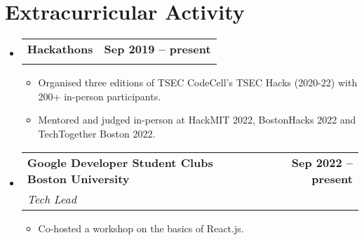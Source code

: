 \documentclass[letterpaper,11pt]{article}
\makeatletter
\newcommand{\resumeItem}[1]{
  \item\small{
    {#1 \vspace{-2pt}}
  }
}
\newcommand{\resumeSubheading}[4]{
  \vspace{-2pt}\item
    \begin{tabular*}{1.0\textwidth}[t]{l@{\extracolsep{\fill}}r}
      \vspace{-2pt}\textbf{#1} & \textbf{\small #2} \\
      \textit{\small#3} & \textit{\small #4} \\
    \end{tabular*}\vspace{-7pt}
}
\newcommand{\resumeSubHeadingListStart}{\begin{itemize}[leftmargin=0.0in, label={}]}
\newcommand{\resumeSubHeadingListEnd}{\end{itemize}}
\newcommand{\resumeItemListStart}{\begin{itemize}}
\newcommand{\resumeItemListEnd}{\end{itemize}\vspace{-5pt}}
\makeatother
\begin{document}
\section{Extracurricular Activity}
    \vspace{-2pt}
    \resumeSubHeadingListStart
        \resumeSubheading
            {Hackathons}{Sep 2019 -- present}
            {}{}
            \vspace{-18pt}
            \resumeItemListStart
                \resumeItem{Organised three editions of TSEC CodeCell's TSEC Hacks (2020-22) with 200+ in-person participants.}
                \resumeItem{Mentored and judged in-person at HackMIT 2022, BostonHacks 2022 and TechTogether Boston 2022.}
            \resumeItemListEnd
        \vspace{-4pt}

        \resumeSubheading
            {Google Developer Student Clubs Boston University}{Sep 2022 -- present}
            {Tech Lead}{}
            \vspace{-7pt}
            \resumeItemListStart
                \resumeItem{Co-hosted a workshop on the basics of React.js.}
            \resumeItemListEnd
    \resumeSubHeadingListEnd
\vspace{-8pt}
\end{document}

